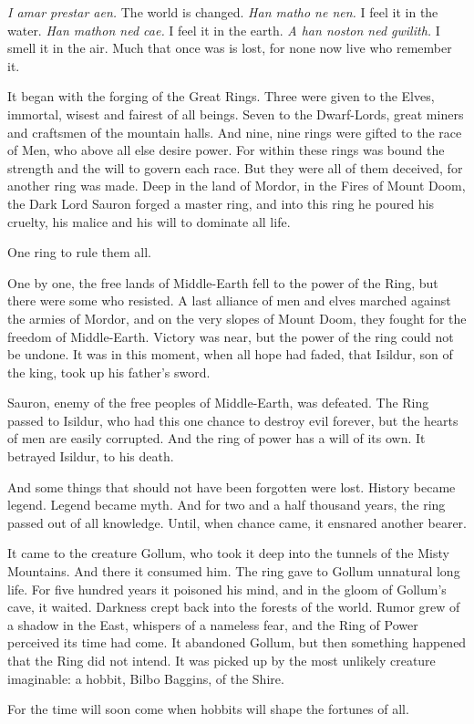 \textit{I amar prestar aen.} The world is changed. \textit{Han matho ne nen.} I feel it in the water. \textit{Han mathon ned cae.} I feel it in the earth. \textit{A han noston ned gwilith.} I smell it in the air. Much that once was is lost, for none now live who remember it.

It began with the forging of the Great Rings. Three were given to the Elves, immortal, wisest and fairest of all beings. Seven to the Dwarf-Lords, great miners and craftsmen of the mountain halls. And nine, nine rings were gifted to the race of Men, who above all else desire power. For within these rings was bound the strength and the will to govern each race. But they were all of them deceived, for another ring was made. Deep in the land of Mordor, in the Fires of Mount Doom, the Dark Lord Sauron forged a master ring, and into this ring he poured his cruelty, his malice and his will to dominate all life.

One ring to rule them all.

One by one, the free lands of Middle-Earth fell to the power of the Ring, but there were some who resisted. A last alliance of men and elves marched against the armies of Mordor, and on the very slopes of Mount Doom, they fought for the freedom of Middle-Earth. Victory was near, but the power of the ring could not be undone. It was in this moment, when all hope had faded, that Isildur, son of the king, took up his father’s sword.

Sauron, enemy of the free peoples of Middle-Earth, was defeated. The Ring passed to Isildur, who had this one chance to destroy evil forever, but the hearts of men are easily corrupted. And the ring of power has a will of its own. It betrayed Isildur, to his death.

And some things that should not have been forgotten were lost. History became legend. Legend became myth. And for two and a half thousand years, the ring passed out of all knowledge. Until, when chance came, it ensnared another bearer.

It came to the creature Gollum, who took it deep into the tunnels of the Misty Mountains. And there it consumed him. The ring gave to Gollum unnatural long life. For five hundred years it poisoned his mind, and in the gloom of Gollum’s cave, it waited. Darkness crept back into the forests of the world. Rumor grew of a shadow in the East, whispers of a nameless fear, and the Ring of Power perceived its time had come. It abandoned Gollum, but then something happened that the Ring did not intend. It was picked up by the most unlikely creature imaginable: a hobbit, Bilbo Baggins, of the Shire.

For the time will soon come when hobbits will shape the fortunes of all.